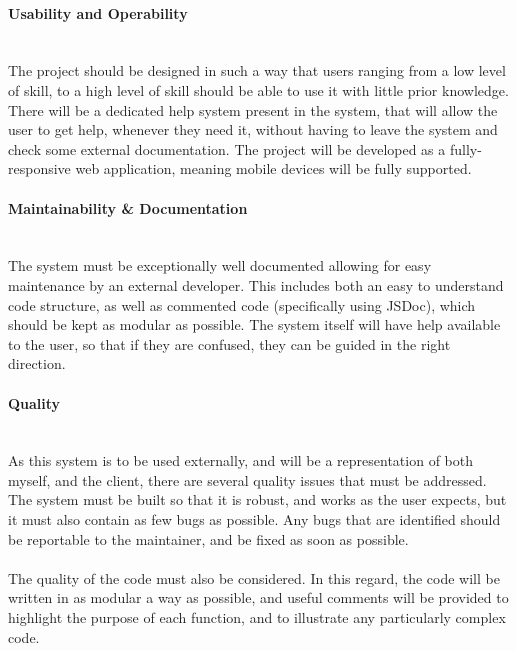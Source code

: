 \paragraph{Usability and Operability}\ \\
The project should be designed in such a way that users ranging from a low level of skill, to a high level of skill should be able to use it with little prior knowledge. There will be a dedicated help system present in the system, that will allow the user to get help, whenever they need it, without having to leave the system and check some external documentation. The project will be developed as a fully-responsive web application, meaning mobile devices will be fully supported.

\paragraph{Maintainability \& Documentation}\ \\
The system must be exceptionally well documented allowing for easy maintenance by an external developer. This includes both an easy to understand code structure, as well as commented code (specifically using JSDoc), which should be kept as modular as possible.  The system itself will have help available to the user, so that if they are confused, they can be guided in the right direction.

\paragraph{Quality}\ \\
As this system is to be used externally, and will be a representation of both myself, and the client, there are several quality issues that must be addressed. The system must be built so that it is robust, and works as the user expects, but it must also contain as few bugs as possible. Any bugs that are identified should be reportable to the maintainer, and be fixed as soon as possible.\ \\
\ \\
The quality of the code must also be considered. In this regard, the code will be written in as modular a way as possible, and useful comments will be provided to highlight the purpose of each function, and to illustrate any particularly complex code.

